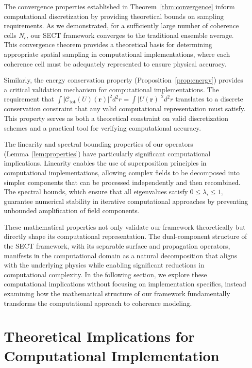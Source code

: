 \documentclass[a4paper,12pt]{article}
\begin{document}
The convergence properties established in Theorem~\ref{thm:convergence} inform computational discretization by providing theoretical bounds on sampling requirements. As we demonstrated, for a sufficiently large number of coherence cells $N_c$, our SECT framework converges to the traditional ensemble average. This convergence theorem provides a theoretical basis for determining appropriate spatial sampling in computational implementations, where each coherence cell must be adequately represented to ensure physical accuracy.

Similarly, the energy conservation property (Proposition~\ref{prop:energy}) provides a critical validation mechanism for computational implementations. The requirement that $\int |\mathcal{C}_{\text{tot}}(U)(\bm{r})|^2 d^2r = \int |U(\bm{r})|^2 d^2r$ translates to a discrete conservation constraint that any valid computational representation must satisfy. This property serves as both a theoretical constraint on valid discretization schemes and a practical tool for verifying computational accuracy.

The linearity and spectral bounding properties of our operators (Lemma~\ref{lem:properties}) have particularly significant computational implications. Linearity enables the use of superposition principles in computational implementations, allowing complex fields to be decomposed into simpler components that can be processed independently and then recombined. The spectral bounds, which ensure that all eigenvalues satisfy $0 \leq \lambda_i \leq 1$, guarantee numerical stability in iterative computational approaches by preventing unbounded amplification of field components.

These mathematical properties not only validate our framework theoretically but directly shape its computational representation. The dual-component structure of the SECT framework, with its separable surface and propagation operators, manifests in the computational domain as a natural decomposition that aligns with the underlying physics while enabling significant reductions in computational complexity. In the following section, we explore these computational implications without focusing on implementation specifics, instead examining how the mathematical structure of our framework fundamentally transforms the computational approach to coherence modeling.


\section{Theoretical Implications for Computational Implementation}
\end{document}
